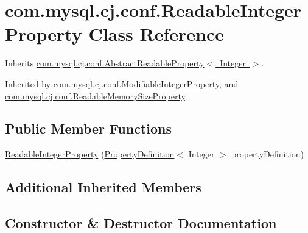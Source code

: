 \hypertarget{classcom_1_1mysql_1_1cj_1_1conf_1_1_readable_integer_property}{}\section{com.\+mysql.\+cj.\+conf.\+Readable\+Integer\+Property Class Reference}
\label{classcom_1_1mysql_1_1cj_1_1conf_1_1_readable_integer_property}


Inherits \mbox{\hyperlink{classcom_1_1mysql_1_1cj_1_1conf_1_1_abstract_readable_property}{com.\+mysql.\+cj.\+conf.\+Abstract\+Readable\+Property$<$ Integer $>$}}.



Inherited by \mbox{\hyperlink{classcom_1_1mysql_1_1cj_1_1conf_1_1_modifiable_integer_property}{com.\+mysql.\+cj.\+conf.\+Modifiable\+Integer\+Property}}, and \mbox{\hyperlink{classcom_1_1mysql_1_1cj_1_1conf_1_1_readable_memory_size_property}{com.\+mysql.\+cj.\+conf.\+Readable\+Memory\+Size\+Property}}.

\subsection*{Public Member Functions}
\begin{DoxyCompactItemize}
\item 
\mbox{\hyperlink{classcom_1_1mysql_1_1cj_1_1conf_1_1_readable_integer_property_adad2f4af839bafab79bfc05df4ac7c2e}{Readable\+Integer\+Property}} (\mbox{\hyperlink{interfacecom_1_1mysql_1_1cj_1_1conf_1_1_property_definition}{Property\+Definition}}$<$ Integer $>$ property\+Definition)
\end{DoxyCompactItemize}
\subsection*{Additional Inherited Members}


\subsection{Constructor \& Destructor Documentation}
\mbox{\label{classcom_1_1mysql_1_1cj_1_1conf_1_1_readable_integer_property_adad2f4af839bafab79bfc05df4ac7c2e}} 
